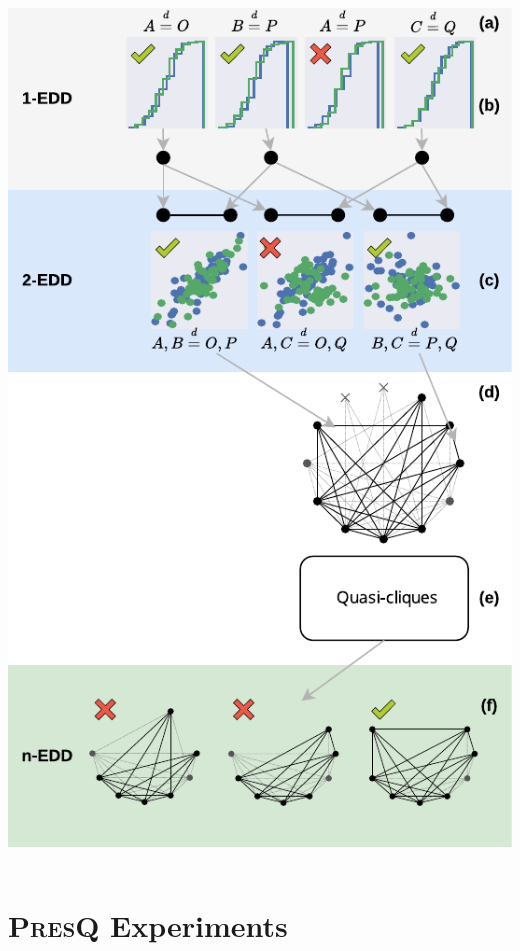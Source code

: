 \documentclass[10pt,notes]{beamer}
\newcommand{\PresQ}[0]{\textsc{PresQ}\xspace}
\begin{document}
\begin{frame}{}
\begin{columns}
\begin{column}{.5\linewidth}
        \includegraphics[width=0.9\linewidth]{pipeline}
    \end{column}
    \end{columns}
\end{frame}

\section{\PresQ Experiments}
\end{document}
